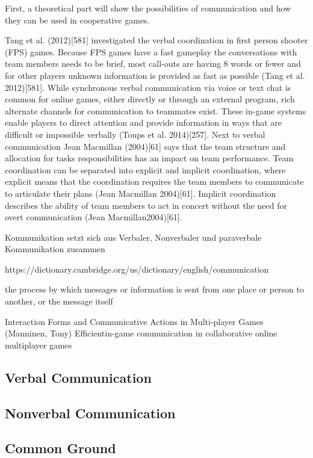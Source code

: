First, a theoretical part will show the possibilities of communication and how they can be
used in cooperative games. 

Tang et al. (2012)[581] investigated the verbal coordination in first person shooter (FPS) games.
Because FPS games have a fast gameplay the conversations with team members needs to be
brief, most call-outs are having 8 words or fewer and for other players unknown information
is provided as fast as possible (Tang et al. 2012)[581]. While synchronous verbal communication
via voice or text chat is common for online games, either directly or through an external
program, rich alternate channels for communication to teammates exist. These in-game systems
enable players to direct attention and provide information in ways that are difficult or
impossible verbally (Toups et al. 2014)[257]. Next to verbal communication Jean Macmillan
(2004)[61] says that the team structure and allocation for tasks responsibilities has an impact
on team performance. Team coordination can be separated into explicit and implicit coordination,
where explicit means that the coordination requires the team members to communicate
to articulate their plans (Jean Macmillan 2004)[61]. Implicit coordination describes the ability
of team members to act in concert without the need for overt communication (Jean Macmillan2004)[61]. 





Kommunikation setzt sich aus Verbaler, Nonverbaler und paraverbale Kommunikation zusammen


https://dictionary.cambridge.org/us/dictionary/english/communication

the process by which messages or information is sent from one place or person to another, or the message itself


Interaction Forms and Communicative Actions in Multi-player Games (Manninen, Tony)
Efficientin-game communication in collaborative online multiplayer games

\subsection{Verbal Communication}
\label{section:Verbal Communication}




\subsection{Nonverbal Communication}
\label{section:Nonverbal Communication}



\subsection{Common Ground}
\label{section:Common Ground}

